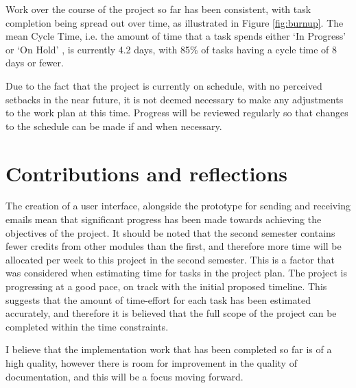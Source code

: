 Work over the course of the project so far has been consistent, with task completion being spread out over time, as illustrated in Figure \ref{fig:burnup}. The mean Cycle Time, i.e. the amount of time that a task spends either `In Progress' or `On Hold' \cite{roock2010kanban}, is currently 4.2 days, with 85\% of tasks having a cycle time of 8 days or fewer.

Due to the fact that the project is currently on schedule, with no perceived setbacks in the near future, it is not deemed necessary to make any adjustments to the work plan at this time. Progress will be reviewed regularly so that changes to the schedule can be made if and when necessary.

\section{Contributions and reflections}

The creation of a user interface, alongside the prototype for sending and receiving emails mean that significant progress has been made towards achieving the objectives of the project. It should be noted that the second semester contains fewer credits from other modules than the first, and therefore more time will be allocated per week to this project in the second semester. This is a factor that was considered when estimating time for tasks in the project plan. The project is progressing at a good pace, on track with the initial proposed timeline. This suggests that the amount of time-effort for each task has been estimated accurately, and therefore it is believed that the full scope of the project can be completed within the time constraints.

I believe that the implementation work that has been completed so far is of a high quality, however there is room for improvement in the quality of documentation, and this will be a focus moving forward.